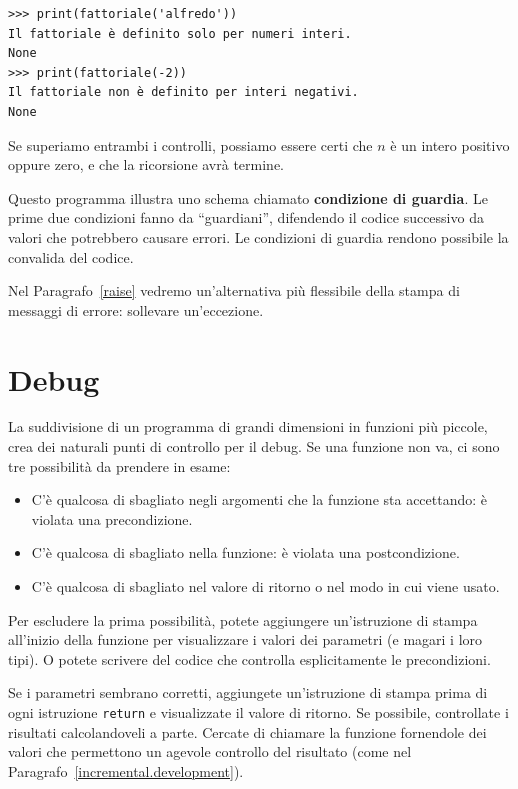 \documentclass[10pt]{book}
\begin{document}
\begin{verbatim}
>>> print(fattoriale('alfredo'))
Il fattoriale è definito solo per numeri interi.
None
>>> print(fattoriale(-2))
Il fattoriale non è definito per interi negativi.
None
\end{verbatim}
% 
Se superiamo entrambi i controlli, possiamo essere
   certi che $n$ è un intero positivo oppure zero, e che la ricorsione avrà
   termine.

Questo programma illustra uno schema chiamato {\bf condizione di guardia}.
Le prime due condizioni fanno da ``guardiani'', difendendo il codice successivo da valori che potrebbero causare errori. Le condizioni di guardia rendono possibile la convalida del codice.

Nel Paragrafo~\ref{raise} vedremo un'alternativa più flessibile della stampa di messaggi di errore: sollevare un'eccezione.


\section{Debug}
\label{factdebug}

La suddivisione di un programma di grandi dimensioni in funzioni più piccole, crea dei naturali punti di controllo per il debug. Se una funzione non va, ci sono tre possibilità da prendere in esame:

\begin{itemize}

\item C'è qualcosa di sbagliato negli argomenti che la funzione sta accettando: è violata una precondizione.

\item C'è qualcosa di sbagliato nella funzione: è violata una postcondizione.

\item C'è qualcosa di sbagliato nel valore di ritorno o nel modo in cui viene usato.

\end{itemize}

Per escludere la prima possibilità, potete aggiungere un'istruzione di stampa all'inizio della funzione per visualizzare i valori dei parametri (e magari i loro tipi). O potete scrivere del codice che controlla esplicitamente le precondizioni.

Se i parametri sembrano corretti, aggiungete un'istruzione di stampa prima di ogni istruzione {\tt return} e visualizzate il valore di ritorno. Se possibile, controllate i risultati calcolandoveli a parte. Cercate di chiamare la funzione fornendole dei valori che permettono un agevole controllo del risultato (come nel Paragrafo~\ref{incremental.development}).
\end{document}
